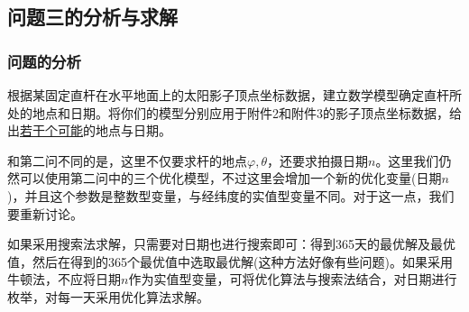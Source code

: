    \subsection{问题三的分析与求解}
        \subsubsection{问题的分析}
            \par
            根据某固定直杆在水平地面上的太阳影子顶点坐标数据，建立数学模型确定直杆所处的地点和日期。将你们的模型分别应用于附件2和附件3的影子顶点坐标数据，给出\underline{若干个可能}的地点与日期。
            \par
            和第二问不同的是，这里不仅要求杆的地点$\varphi,\theta$，还要求拍摄日期$n$。这里我们仍然可以使用第二问中的三个优化模型，不过这里会增加一个新的优化变量(日期$n$)，并且这个参数是整数型变量，与经纬度的实值型变量不同。对于这一点，我们要重新讨论。
            \par
            如果采用搜索法求解，只需要对日期也进行搜索即可：得到365天的最优解及最优值，然后在得到的365个最优值中选取最优解(这种方法好像有些问题)。如果采用牛顿法，不应将日期$n$作为实值型变量，可将优化算法与搜索法结合，对日期进行枚举，对每一天采用优化算法求解。
